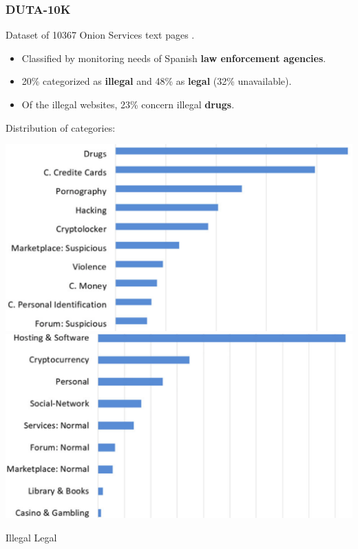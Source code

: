 \documentclass[t,xcolor={svgnames,table}]{beamer}
\begin{document}
\begin{frame}
	\frametitle{DUTA-10K}
	
	Dataset of 10367 Onion Services text pages \cite{AlNabki19}.

	\begin{itemize}\setlength\itemsep{1em}
		\item Classified by monitoring needs of Spanish \textbf{law enforcement agencies}.
		\item 20\% categorized as \textbf{illegal} and 48\% as \textbf{legal} (32\% unavailable).
		\item Of the illegal websites, 23\% concern illegal \textbf{drugs}.
	\end{itemize}
	\vfill
	\pause

	Distribution of categories:
	
	\includegraphics[width=.49\textwidth]{suspicious.png}\hfill\includegraphics[width=.49\textwidth]{normal.png}
	
	\hspace{2cm} Illegal \hspace{5cm} Legal
\end{frame}
\end{document}
